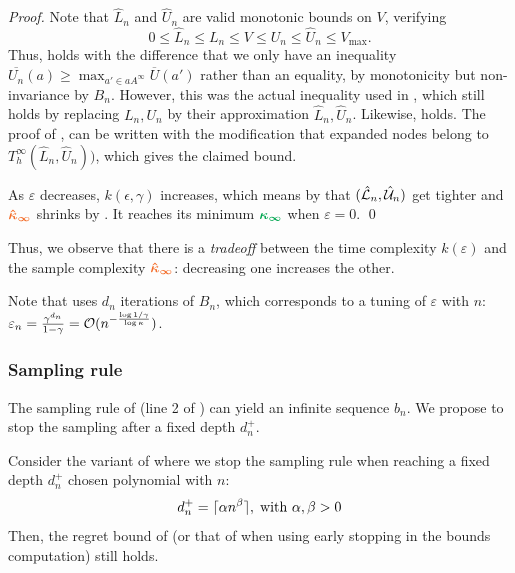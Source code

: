 \documentclass[runningheads]{llncs}
\begin{document}
\begin{proof}
	Note that $\hat{L}_n$ and $\hat{U}_n$ are valid monotonic bounds on $V$, verifying
	\[0\leq \hat{L}_n\leq {L}_n \leq V \leq {U}_n\leq \hat{U}_n \leq V_{\max}.\]
	Thus,  holds with the difference that we only have an inequality $\overline{U_n}(a) \geq \max_{a'\in a A^\infty} \overline{U}(a')$ rather than an equality, by monotonicity but non-invariance by $B_n$. However, this was the actual inequality used in , which still holds by replacing $L_n,U_n$ by their approximation $\hat{L}_n,\hat{U}_n$. Likewise,  holds. The proof of , can be written with the modification that expanded nodes belong to $T_h^\infty(\hat{L}_n, \hat{U}_n))$, which gives the claimed bound.
	
	As $\varepsilon$ decreases, $k(\epsilon,\gamma)$ increases, which means by  that $(\hat{\mathcal{L}}_n, \hat{\mathcal{U}}_n)$ get tighter and $\hlob{\hat{\kappa}_\infty}$ shrinks by . It reaches its minimum $\hlgb{\kappa_\infty}$ when $\varepsilon=0$.
\qed\end{proof}

Thus, we observe that there is a \emph{tradeoff} between the time complexity $k(\varepsilon)$ and the sample complexity $\hlob{\hat{\kappa}_\infty}$: decreasing one increases the other.

Note that \OPD uses $d_n$ iterations of $B_n$, which corresponds to a tuning of $\varepsilon$ with $n$: $\varepsilon_n = \frac{\gamma^{d_n}}{1-\gamma} = \mathcal{O}(n^{-\frac{\log 1/\gamma}{\log \kappa}})$. 


\subsubsection{Sampling rule}

The sampling rule of \GBOPD (line 2 of \GBOPD) can yield an infinite sequence $b_n$. We propose to stop the sampling after a fixed depth $d^+_n$.

\begin{proposition}
	Consider the variant of \GBOPD where we stop the sampling rule when reaching a fixed depth $d^+_n$ chosen polynomial with $n$:
	\[d^+_n = \lceil\alpha n^\beta\rceil,\; \text{with }\alpha,\beta > 0\]
	Then, the regret bound of  (or that of  when using early stopping in the bounds computation) still holds.
\end{proposition}
\end{document}
